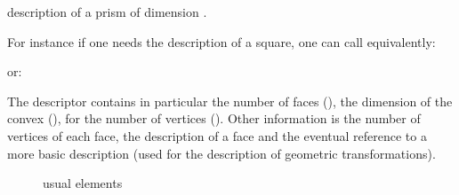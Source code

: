 \documentclass[a4paper,11pt,english]{sphinxmanual}
\begin{document}

\begin{fulllineitems}
\label{\detokenize{project/femdesc:_CPPv4N5bgeot18prism_P1_structureE8dim_type}}%
\pysigstartmultiline
{}%
\pysigstopmultiline
description of a prism of dimension .

\end{fulllineitems}


For instance if one needs the description of a square, one can call
equivalently:

\begin{sphinxVerbatim}[commandchars=\\\{\}]
  
\end{sphinxVerbatim}

or:

\begin{sphinxVerbatim}[commandchars=\\\{\}]
  
\end{sphinxVerbatim}

The descriptor contains in particular the number of faces (),
the dimension of the convex (), for the number of vertices
(). Other information is the number of vertices of each face,
the description of a face and the eventual reference to a more basic description
(used for the description of geometric transformations).

\begin{figure}[htbp]
\centering
\capstart

\noindent{}
\caption{usual elements}\label{\detokenize{project/femdesc:id1}}\label{\detokenize{project/femdesc:dp-fig-elem}}\end{figure}
\end{document}
